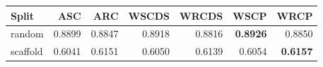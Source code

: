 \begin{tabular}{lrrrrrr}
\toprule
Split & ASC & ARC & WSCDS & WRCDS & WSCP & WRCP \\
\midrule
random & 0.8899 & 0.8847 & 0.8918 & 0.8816 & \textbf{0.8926} & 0.8850 \\
scaffold & 0.6041 & 0.6151 & 0.6050 & 0.6139 & 0.6054 & \textbf{0.6157} \\
\bottomrule
\end{tabular}